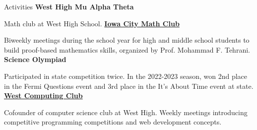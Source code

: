 \begin{rubric}{Activities}
\entry*[2019-present] \textbf{West High Mu Alpha Theta}
    \par Math club at West High School.
\entry*[2021-present] \textbf{\href{https://homepage.divms.uiowa.edu/~mftehrani/MathClub.html}{Iowa City Math Club}}
    \par Biweekly meetings during the school year for high and middle school students to build proof-based mathematics skills, organized by Prof. Mohammad F. Tehrani.
\entry*[2021-present] \textbf{Science Olympiad}
    \par Participated in state competition twice. In the 2022-2023 season, won 2nd place in the Fermi Questions event and 3rd place in the It's About Time event at state.
\entry*[2023] \textbf{\href{https://west-computing-club.github.io}{West Computing Club}}
    \par Cofounder of computer science club at West High. Weekly meetings introducing competitive programming competitions and web development concepts.
\end{rubric}
